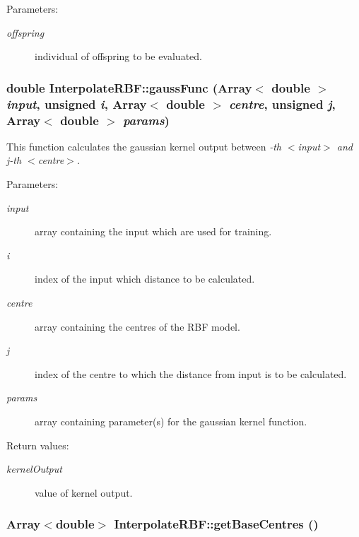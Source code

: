 \begin{Desc}
\item[Parameters:]
\begin{description}
\item[{\em offspring}]individual of offspring to be evaluated.\end{description}
\end{Desc}
\subsubsection{\setlength{\rightskip}{0pt plus 5cm}double Interpolate\-RBF::gauss\-Func (Array$<$ double $>$ {\em input}, unsigned {\em i}, Array$<$ double $>$ {\em centre}, unsigned {\em j}, Array$<$ double $>$ {\em params})\hspace{0.3cm}{\tt  [static]}}\label{classInterpolateRBF_e1}


This function calculates the gaussian kernel output between {\em -th $<$input$>$ and j-th $<$centre$>$. \/}

\begin{Desc}
\item[Parameters:]
\begin{description}
\item[{\em input}]array containing the input which are used for training. \item[{\em i}]index of the input which distance to be calculated. \item[{\em centre}]array containing the centres of the RBF model. \item[{\em j}]index of the centre to which the distance from input is to be calculated. \item[{\em params}]array containing parameter(s) for the gaussian kernel function. \end{description}
\end{Desc}
\begin{Desc}
\item[Return values:]
\begin{description}
\item[{\em kernel\-Output}]value of kernel output.\end{description}
\end{Desc}
\subsubsection{\setlength{\rightskip}{0pt plus 5cm}Array$<$double$>$ Interpolate\-RBF::get\-Base\-Centres ()}\label{classInterpolateRBF_a13}


